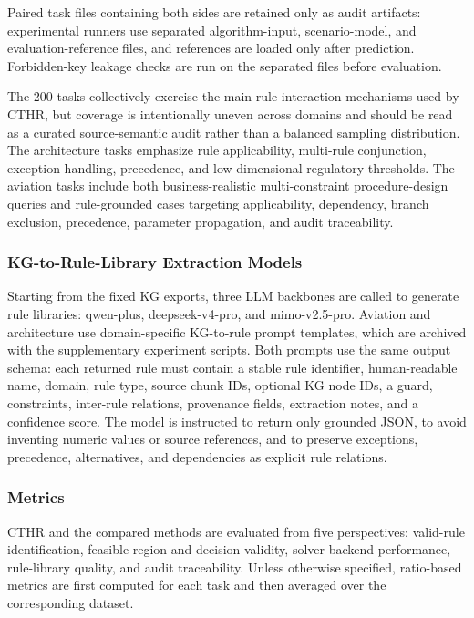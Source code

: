 ﻿\documentclass[a4paper,fleqn]{cas-dc}
\newcommand{\CTHR}{\textsc{CTHR}}
\begin{document}
Paired task files containing both sides are retained only as audit artifacts:
experimental runners use separated algorithm-input, scenario-model, and
evaluation-reference files, and references are loaded only after prediction.
Forbidden-key leakage checks are run on the separated files before evaluation.

The 200 tasks collectively exercise the main rule-interaction mechanisms used
by \CTHR{}, but coverage is intentionally uneven across domains and should be
read as a curated source-semantic audit rather than a balanced sampling
distribution. The architecture tasks emphasize rule applicability,
multi-rule conjunction, exception handling, precedence, and low-dimensional
regulatory thresholds. The aviation tasks include both business-realistic
multi-constraint procedure-design queries and rule-grounded cases targeting
applicability, dependency, branch exclusion, precedence, parameter propagation,
and audit traceability.

\subsubsection*{KG-to-Rule-Library Extraction Models}
Starting from the fixed KG exports, three LLM backbones are called to generate
rule libraries: qwen-plus, deepseek-v4-pro, and
mimo-v2.5-pro. Aviation and architecture use domain-specific
KG-to-rule prompt templates, which are archived with the supplementary experiment scripts. Both prompts use the same output schema: each returned rule  must contain a stable rule identifier, human-readable name, domain, rule type, source chunk IDs, optional KG node IDs, a guard, constraints, inter-rule relations, provenance fields, extraction notes, and a confidence score. The model is instructed to return only grounded JSON,
to avoid inventing numeric values or source references, and to preserve exceptions, precedence, alternatives, and dependencies as explicit rule relations.


\subsubsection*{Metrics}


CTHR and the compared methods are evaluated from five perspectives: valid-rule identification, feasible-region and decision validity, solver-backend performance, rule-library quality, and audit traceability. Unless otherwise specified, ratio-based metrics are first computed for each task and then averaged over the corresponding dataset.
\end{document}
